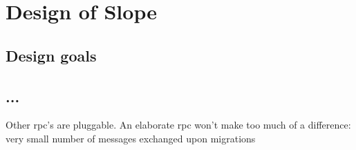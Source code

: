 \chapter{Design of Slope}
\label{chap:design}

\section{Design goals}
\section{...}

Other rpc's are pluggable.
An elaborate rpc won't make too much of a difference: very small number of messages exchanged upon migrations
